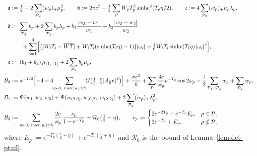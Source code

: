 \begin{align*}
  \mathfrak a&:=\tfrac12-2\sum_{\mathcal P_2}(w_p)_+\mu_p^2,\qquad
  \mathfrak b:=2\pi c^2-\tfrac12\sum_{\mathcal P}W_pT_p^2\operatorname{sinhc}^2(T_p\eta/2),\qquad
  \mathfrak c:=4\sum_{\mathcal P_2}(w_p)_+\mu_p\lambda_p,\\
  \mathfrak d&:=\sum_{\mathcal P_3}\bar b_p+2\sum_{\mathcal P_2}\bar b_p\lambda_p+\bar b_1\frac{|w_3-w_1|}{w_1}+\bar b_2\frac{|w_3-w_2|}{w_2}\\
     &\qquad+\sum_{i=1}^3\Bigl[\bigl(|W_iT_i-\overline{WT}|+W_iT_i(\operatorname{sinhc}(T_i\eta)-1)\bigr)|\omega_i|+\tfrac16W_iT_i\operatorname{sinhc}(T_i\eta)\,|\omega_i|^3\Bigr],\\
  \mathfrak e&:=(\bar b_1+\bar b_2)\,\mu_{(1,-1)}+2\sum_{\mathcal P_2}\bar b_p\mu_p ,\\
  \mathcal B_0&:=a^{-1/2}\Bigl[-4+4\!\!\sum_{n\succ0,\ \max|n_i|\le2}\!\!\Ga\bigl(\tfrac12,\tfrac\pi a|A_\parallel n|^2\bigr)\Bigr]+\frac{\pi c^2}6
      +\sum_{\mathcal P}\frac{4c}{\varkappa_p}e^{-T_p}\cos2\omega_p-\frac12\sum_{\mathcal P_1\cup\mathcal P_3}w_p+\sum_{\mathcal P_2}w_p,\\
  \mathcal B_1&:=\Psi(w_1,w_2,w_3)+\Psi(w_{(2,0)},w_{(0,2)},w_{(2,2)})+2\sum_{\mathcal P_2}(w_p)_+\lambda_p^2,\\
  \mathcal B_2&:=\sum_{p\succ0,\ \max|p_i|\le5}\frac{2c}{\varkappa_p}\,\frac{\nu_p}{1-e^{-T_p}}+\mathcal R_6\bigl(\tfrac12-\eta\bigr),\qquad
   \nu_p:=\begin{cases}2e^{-2T_p}+e^{-T_p}E_p,&p\in\mathcal P,\\2e^{-T_p}+E_p,&p\notin\mathcal P,\end{cases}
\end{align*}
where $E_p:=e^{-T_p(\frac12-\eta)}+e^{-T_p(\frac12+\eta)}$ and $\mathcal R_6$ is the bound of Lemma~\ref{lem:det-ptail}.

